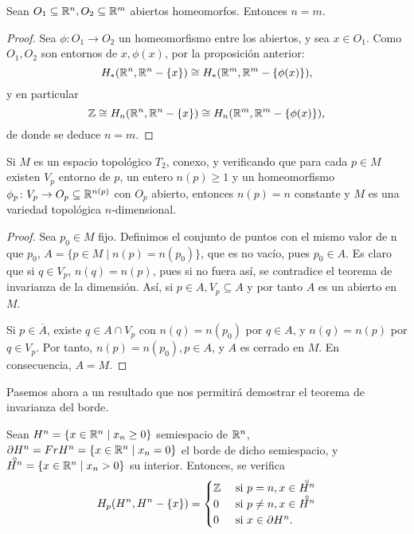 \begin{theorem}
  Sean $O_1 \subseteq \mathbb{R}^n, O_2 \subseteq \mathbb{R}^m$ abiertos homeomorfos. Entonces $n = m$.
\end{theorem}

\begin{proof}
  Sea $\phi \colon O_1 \to O_2$ un homeomorfismo entre los abiertos, y sea $x \in O_1$. Como $O_1, O_2$ son entornos de $x, \phi(x)$,
  por la proposición anterior:
  \[H_*(\mathbb{R}^n, \mathbb{R}^n - \{x\}) \cong H_*(\mathbb{R}^m, \mathbb{R}^m - \{\phi(x)\}), \]
  y en particular
  \[ \mathbb{Z} \cong H_n(\mathbb{R}^n, \mathbb{R}^n - \{x\}) \cong H_n(\mathbb{R}^m, \mathbb{R}^m - \{\phi(x)\}), \]
  de donde se deduce $n = m$.
\end{proof}

\begin{corollary}
  Si $M$ es un espacio topológico $T_2$, conexo, y verificando que para cada $p \in M$ existen $V_p$ entorno de $p$, un entero
  $n(p) \geq 1$ y un homeomorfismo $\phi_p \colon V_p \to O_p \subseteq \mathbb{R}^{n(p)}$ con $O_p$ abierto, entonces
  $n(p) = n$ constante y $M$ es una variedad topológica $n$-dimensional.
\end{corollary}

\begin{proof}
  Sea $p_0 \in M$ fijo. Definimos el conjunto de puntos con el mismo valor de n que $p_0$, $A = \{p \in M \mid n(p) = n(p_0)\}$,
  que es no vacío, pues $p_0 \in A$. Es claro que si $q \in V_p$, $n(q) = n(p)$, pues si no fuera así, se contradice el teorema
  de invarianza de la dimensión. Así, si $p \in A, V_p \subseteq A$ y por tanto $A$ es un abierto en $M$.

  Si $p \in \overline{A}$, existe $q \in A \cap V_p$ con $n(q) = n(p_0)$ por $q \in A$, y $n(q) = n(p)$ por $q \in V_p$.
  Por tanto, $n(p) = n(p_0), p \in A$, y $A$ es cerrado en $M$. En consecuencia, $A = M$.
\end{proof}

Pasemos ahora a un resultado que nos permitirá demostrar el teorema de invarianza del borde.

\begin{lemma}
  Sean $H^n = \{x \in \mathbb{R}^n \mid x_n \geq 0 \}$ semiespacio de $\mathbb{R}^n$, $\partial H^n = Fr H^n = \{x \in \mathbb{R}^n \mid x_n = 0\}$
  el borde de dicho semiespacio, y $\interior{H^n} = \{x \in \R^n \mid x_n > 0\}$ su interior. Entonces, se verifica
  \[H_p(H^n, H^n - \{x\}) =
    \begin{cases} \Z &\text{ si } p = n, x \in \interior{H^n} \\
                  0  &\text{ si } p \neq n, x \in \interior{H^n} \\
                  0  &\text{ si } x \in \partial H^n.  \end{cases} \]
\end{lemma}

